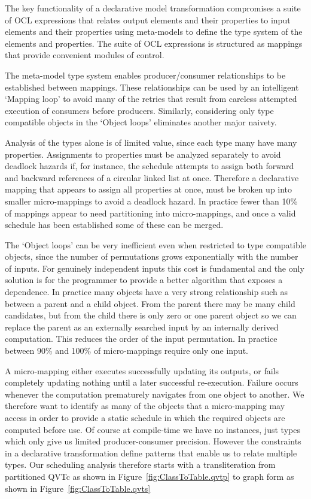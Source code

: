 \documentclass{llncs}
\begin{document}
The key functionality of a declarative model transformation compromises a suite of OCL expressions that relates output elements and their properties to input elements and their properties using meta-models to define the type system of the elements and properties. The suite of OCL expressions is structured as mappings that provide convenient modules of control.

The meta-model type system enables producer/consumer relationships to be established between mappings. These relationships can be used by an intelligent `Mapping loop' to avoid many of the retries that result from careless attempted execution of consumers before producers. Similarly, considering only type compatible objects in the `Object loops' eliminates another major naivety. 

Analysis of the types alone is of limited value, since each type many have many properties. Assignments to properties must be analyzed separately to avoid deadlock hazards if, for instance, the schedule attempts to assign both forward and backward references of a circular linked list at once. Therefore a declarative mapping that appears to assign all properties at once, must be broken up into smaller micro-mappings to avoid a deadlock hazard. In practice fewer than 10\% of mappings appear to need partitioning into micro-mappings, and once a valid schedule has been established some of these can be merged.

The `Object loops' can be very inefficient even when restricted to type compatible objects, since the number of permutations grows exponentially with the number of inputs. For genuinely independent inputs this cost is fundamental and the only solution is for the programmer to provide a better algorithm that exposes a dependence. In practice many objects have a very strong relationship such as between a parent and a child object. From the parent there may be many child candidates, but from the child there is only zero or one parent object so we can replace the parent as an externally searched input by an internally derived computation. This reduces the order of the input permutation. In practice between 90\% and 100\% of micro-mappings require only one input.

A micro-mapping either executes successfully updating its outputs, or fails completely updating nothing until a later successful re-execution. Failure occurs whenever the computation prematurely navigates from one object to another. We therefore want to identify as many of the objects that a micro-mapping may access in order to provide a static schedule in which the required objects are computed before use. Of course at compile-time we have no instances, just types which only give us limited producer-consumer precision. However the constraints in a declarative transformation define patterns that enable us to relate multiple types. Our scheduling analysis therefore starts with a transliteration from partitioned QVTc as shown in Figure~\ref{fig:ClassToTable.qvtp} to graph form as shown in Figure~\ref{fig:ClassToTable.qvts}
\end{document}
